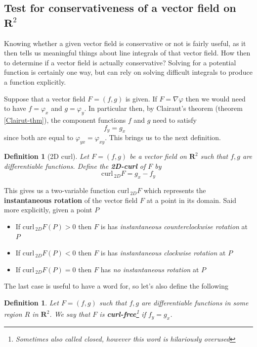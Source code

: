 \documentclass[12pt]{article}
\numberwithin{equation}{subsection}
\numberwithin{figure}{subsection}
\newtheorem{defn}[subsection]{Definition}
\theoremstyle{note}
\newcommand{\curl}{\mathrm{curl\,}}
\begin{document}
{\subsection{Test for conservativeness of a vector field on $\mathbf{R}^2$} Knowing whether a given vector field is conservative or not is fairly useful, as it then tells us meaningful things about line integrals of that vector field. How then to determine if a vector field is actually conservative? Solving for a potential function is certainly one way, but can rely on solving difficult integrals to produce a function explicitly.

Suppose that a vector field $F=(f,g)$ is given. If $F=\nabla \varphi$ then we would need to have $f=\varphi_x$ and $g=\varphi_y$. In particular then, by Clairaut's theorem (theorem \ref{Clairut-thm}), the component functions $f$ and $g$ need to satisfy \begin{equation} \label{curl-free} f_y=g_x \qquad \qquad\end{equation} since both are equal to $\varphi_{yx}=\varphi_{xy}$. 
This brings us to the next definition.

\begin{defn}[2D curl]Let $F=(f,g)$ be a vector field on $\mathbf{R}^2$ such that $f,g$ are differentiable functions. Define the \textbf{2D-curl} of $F$ by \begin{equation} \curl_{2D} F=g_x-f_y\end{equation}\end{defn}

This gives us a two-variable function $\curl_{2D} F$ which represents the \textbf{instantaneous rotation} of the vector field $F$ at a point in its domain. Said more explicitly, given a point $P$ 
\begin{itemize}
	\item If $\curl_{2D}F(P)>0$ then $F$ is has \textit{instantaneous counterclockwise rotation} at $P$
	\item If $\curl_{2D}F(P)<0$ then $F$ is has \textit{instantaneous clockwise rotation} at $P$
	\item If $\curl_{2D}F(P)=0$ then $F$ has \textit{no instantaneous rotation} at $P$
\end{itemize}
The last case is useful to have a word for, so let's also define the following
\begin{defn} \label{def-curl-free} Let $F=(f,g)$ such that $f,g$ are differentiable functions in some region $R$ in $\mathbf{R}^2$. We say that $F$ is \textbf{curl-free}\footnote{Sometimes also called \textit{closed}, however this word is hilariously overused} if $f_y=g_x$. 
\end{defn}

}
\end{document}

